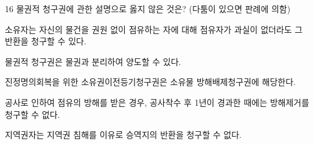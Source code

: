 \begin{question}{16}
물권적 청구권에 관한 설명으로 옳지 않은 것은? (다툼이 있으면 판례에 의함)
\begin{choices}
  \item 소유자는 자신의 물건을 권원 없이 점유하는 자에 대해 점유자가 과실이 없더라도 그 반환을 청구할 수 있다.
  \item 물권적 청구권은 물권과 분리하여 양도할 수 있다.
  \item 진정명의회복을 위한 소유권이전등기청구권은 소유물 방해배제청구권에 해당한다.
  \item 공사로 인하여 점유의 방해를 받은 경우, 공사착수 후 1년이 경과한 때에는 방해제거를 청구할 수 없다.
  \item 지역권자는 지역권 침해를 이유로 승역지의 반환을 청구할 수 없다.
\end{choices}
\end{question}
